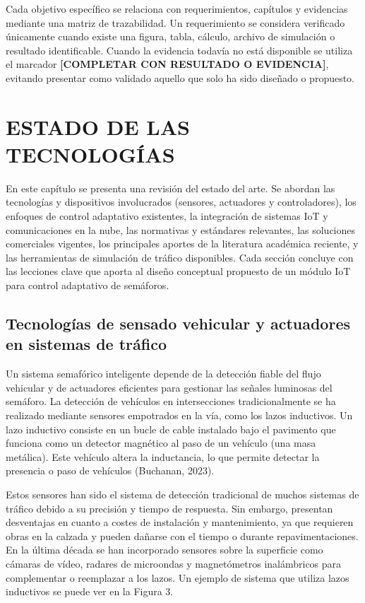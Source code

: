 \documentclass[12pt,a4paper,oneside]{report}
\begin{document}
Cada objetivo específico se relaciona con requerimientos, capítulos y evidencias mediante una matriz de trazabilidad. Un requerimiento se considera verificado únicamente cuando existe una figura, tabla, cálculo, archivo de simulación o resultado identificable. Cuando la evidencia todavía no está disponible se utiliza el marcador \textbf{[COMPLETAR CON RESULTADO O EVIDENCIA]}, evitando presentar como validado aquello que solo ha sido diseñado o propuesto.

\chapter{ESTADO DE LAS TECNOLOGÍAS}\label{capuxedtulo-2-estado-de-las-tecnologuxedas}

En este capítulo se presenta una revisión del estado del arte. Se abordan las tecnologías y dispositivos involucrados (sensores, actuadores y controladores), los enfoques de control adaptativo existentes, la integración de sistemas IoT y comunicaciones en la nube, las normativas y estándares relevantes, las soluciones comerciales vigentes, los principales aportes de la literatura académica reciente, y las herramientas de simulación de tráfico disponibles. Cada sección concluye con las lecciones clave que aporta al diseño conceptual propuesto de un módulo IoT para control adaptativo de semáforos.

\section{Tecnologías de sensado vehicular y actuadores en sistemas de tráfico}\label{tecnologuxedas-de-sensado-vehicular-y-actuadores-en-sistemas-de-truxe1fico}

Un sistema semafórico inteligente depende de la detección fiable del flujo vehicular y de actuadores eficientes para gestionar las señales luminosas del semáforo. La detección de vehículos en intersecciones tradicionalmente se ha realizado mediante sensores empotrados en la vía, como los lazos inductivos. Un lazo inductivo consiste en un bucle de cable instalado bajo el pavimento que funciona como un detector magnético al paso de un vehículo (una masa metálica). Este vehículo altera la inductancia, lo que permite detectar la presencia o paso de vehículos (Buchanan, 2023).

Estos sensores han sido el sistema de detección tradicional de muchos sistemas de tráfico debido a su precisión y tiempo de respuesta. Sin embargo, presentan desventajas en cuanto a costes de instalación y mantenimiento, ya que requieren obras en la calzada y pueden dañarse con el tiempo o durante repavimentaciones. En la última década se han incorporado sensores sobre la superficie como cámaras de vídeo, radares de microondas y magnetómetros inalámbricos para complementar o reemplazar a los lazos. Un ejemplo de sistema que utiliza lazos inductivos se puede ver en la Figura 3.
\end{document}
